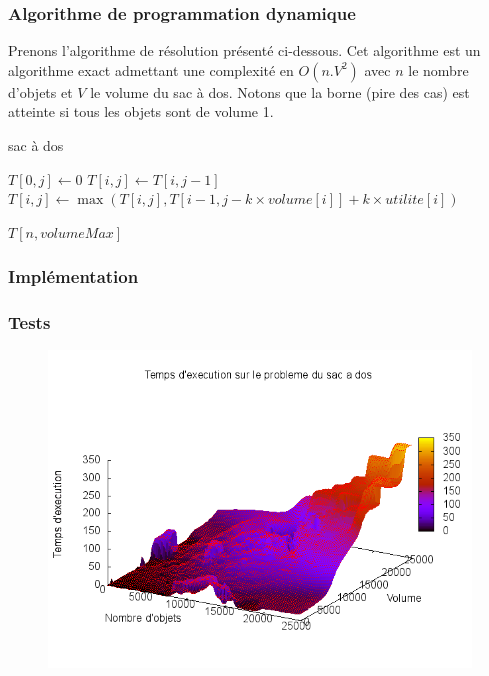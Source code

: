 \subsubsection{Algorithme de programmation dynamique}
Prenons l'algorithme de résolution présenté ci-dessous. Cet algorithme est un algorithme exact admettant une complexité en $O(n.V^2)$ avec $n$ le nombre d'objets et $V$ le volume du sac à dos. Notons que la borne (pire des cas) est atteinte si tous les objets sont de volume 1.
\begin{algorithm}[H]
	\caption{sac à dos}
	\begin{algorithmic}[1]
				\STATE $T[0, j] \leftarrow 0$
		\ENDFOR
					\STATE $T[i, j] \leftarrow T[i, j-1]$
				\ENDIF
					\STATE $T[i,j] \leftarrow \max(T[i,j], T[i-1,j-k \times volume[i]] + k \times utilite[i])$
				\ENDFOR
			\ENDFOR
		\ENDFOR
	
	\RETURN $T[n,volumeMax]$
	\end{algorithmic}
\end{algorithm}

\subsubsection{Implémentation}\label{bag_impl}

\subsubsection{Tests}

\begin{figure}[H]
	\includegraphics[width=\linewidth]{../pratique/prog_dynamique_dev/res/bag.png}
\end{figure}


